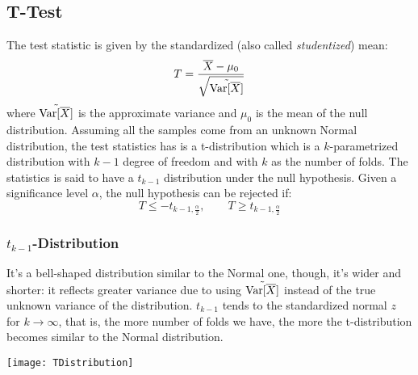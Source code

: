 \subsection{T-Test}
The test statistic is given by the standardized (also called \textit{studentized}) mean:
\[T=\dfrac{\overline{X}-\mu_0}{\sqrt{\tilde{\text{Var}[\overline{X}]}}}\]
where $\tilde{\text{Var}[\overline{X}]}$ is the approximate variance and $\mu_0$ is the mean of the null distribution. \newline
Assuming all the samples come from an unknown Normal distribution, the test statistics has is a t-distribution which is a $k$-parametrized distribution with $k-1$ degree of freedom and with $k$ as the number of folds. The statistics is said to have a $t_{k-1}$ distribution under the null hypothesis. \newline
Given a significance level $\alpha$, the null hypothesis can be rejected if:
\[T\leq -t_{k-1,\frac{\alpha}{2}}, \qquad T\geq t_{k-1,\frac{\alpha}{2}}\]
%
\subsubsection{$t_{k-1}$-Distribution}
It's a bell-shaped distribution similar to the Normal one, though, it's wider and shorter: it reflects greater variance due to using $\tilde{\text{Var}[\overline{X}]}$ instead of the true unknown variance of the distribution. \newline
$t_{k-1}$ tends to the standardized normal $z$ for $k\rightarrow\infty$, that is, the more number of folds we have, the more the t-distribution becomes similar to the Normal distribution.
\begin{center}
  \texttt{[image: TDistribution]}
\end{center}
%
%
